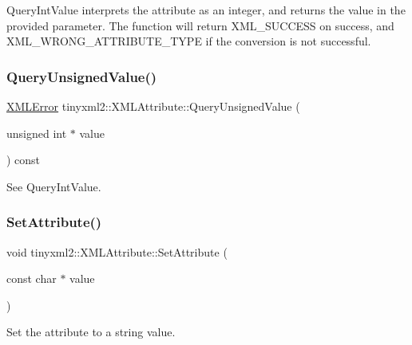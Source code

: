 Query\+Int\+Value interprets the attribute as an integer, and returns the value in the provided parameter. The function will return X\+M\+L\+\_\+\+S\+U\+C\+C\+E\+SS on success, and X\+M\+L\+\_\+\+W\+R\+O\+N\+G\+\_\+\+A\+T\+T\+R\+I\+B\+U\+T\+E\+\_\+\+T\+Y\+PE if the conversion is not successful. \mbox{\label{classtinyxml2_1_1_x_m_l_attribute_a48a7f3496f1415832e451bd8d09c9cb9}} 
\subsubsection{\texorpdfstring{Query\+Unsigned\+Value()}{QueryUnsignedValue()}}
{\footnotesize\ttfamily \hyperlink{namespacetinyxml2_a1fbf88509c3ac88c09117b1947414e08}{X\+M\+L\+Error} tinyxml2\+::\+X\+M\+L\+Attribute\+::\+Query\+Unsigned\+Value (\begin{DoxyParamCaption}\item[{unsigned int $\ast$}]{value }\end{DoxyParamCaption}) const}



See Query\+Int\+Value. 

\mbox{\label{classtinyxml2_1_1_x_m_l_attribute_a406d2c4a13c7af99a65edb59dd9f7581}} 
\subsubsection{\texorpdfstring{Set\+Attribute()}{SetAttribute()}\hspace{0.1cm}{\footnotesize\ttfamily [1/7]}}
{\footnotesize\ttfamily void tinyxml2\+::\+X\+M\+L\+Attribute\+::\+Set\+Attribute (\begin{DoxyParamCaption}\item[{const char $\ast$}]{value }\end{DoxyParamCaption})}



Set the attribute to a string value. 

